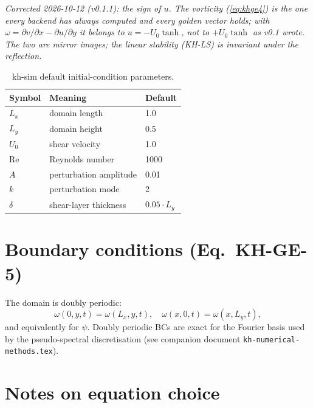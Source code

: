 \documentclass[11pt,a4paper]{article}
\theoremstyle{definition}
\theoremstyle{plain}
\begin{document}
\noindent\emph{Corrected 2026-10-12 (v0.1.1): the sign of $u$. The vorticity
(\ref{eq:khge4}) is the one every backend has always computed and every golden
vector holds; with $\omega = \partial v/\partial x - \partial u/\partial y$ it
belongs to $u = -U_0\tanh$, not to $+U_0\tanh$ as v0.1 wrote. The two are mirror
images; the linear stability (KH-LS) is invariant under the reflection.}

\begin{table}[h]
\centering
\caption{kh-sim default initial-condition parameters.}
\label{tab:defaults}
\begin{tabular}{lll}
\toprule
\textbf{Symbol} & \textbf{Meaning} & \textbf{Default} \\
\midrule
$L_x$ & domain length              & 1.0 \\
$L_y$ & domain height              & 0.5 \\
$U_0$ & shear velocity             & 1.0 \\
Re    & Reynolds number            & 1000 \\
$A$   & perturbation amplitude     & 0.01 \\
$k$   & perturbation mode          & 2 \\
$\delta$ & shear-layer thickness   & $0.05 \cdot L_y$ \\
\bottomrule
\end{tabular}
\end{table}

\section{Boundary conditions (Eq.\ KH-GE-5)}

The domain is doubly periodic:
\begin{equation}
\label{eq:khge5}
\omega(0, y, t) = \omega(L_x, y, t),
\quad
\omega(x, 0, t) = \omega(x, L_y, t),
\tag{KH-GE-5}
\end{equation}
and equivalently for $\psi$. Doubly periodic BCs are exact for the
Fourier basis used by the pseudo-spectral discretisation
(see companion document \texttt{kh-numerical-methods.tex}).

\section{Notes on equation choice}
\end{document}
